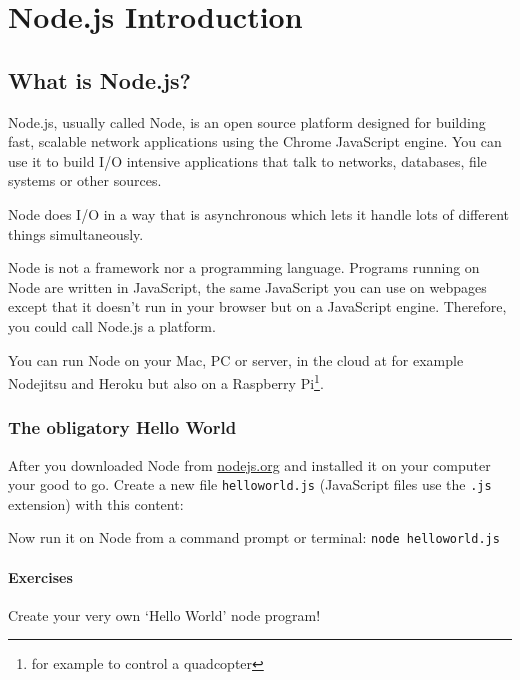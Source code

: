 \documentclass[a4paper]{report}
\begin{document}
\chapter*{\textcolor{seccol}{Node.js} Introduction}

\section*{What is Node.js?}
Node.js, usually called Node, is an open source platform designed for building fast, scalable network applications using the Chrome JavaScript engine. You can use it to build I/O intensive applications that talk to networks, databases, file systems or other sources.

Node does I/O in a way that is asynchronous which lets it handle lots of different things simultaneously.

Node is not a framework nor a programming language. Programs running on Node are written in JavaScript, the same JavaScript you can use on webpages except that it doesn't run in your browser but on a JavaScript engine. Therefore, you could call Node.js a platform.

You can run Node on your Mac, PC or server, in the cloud at for example Nodejitsu and Heroku but also on a Raspberry Pi\footnote{for example to control a quadcopter}. 

\subsection*{The obligatory Hello World}

After you downloaded Node from \href{http://nodejs.org}{nodejs.org} and installed it on your computer your good to go. Create a new file \texttt{helloworld.js} (JavaScript files use the \texttt{.js} extension) with this content:



\noindent Now run it on Node from a command prompt or terminal: \colorbox{codecol}{\lstinline[language=bash]{node helloworld.js}}

\subsubsection*{Exercises}
Create your very own `Hello World' node program!
\end{document}

